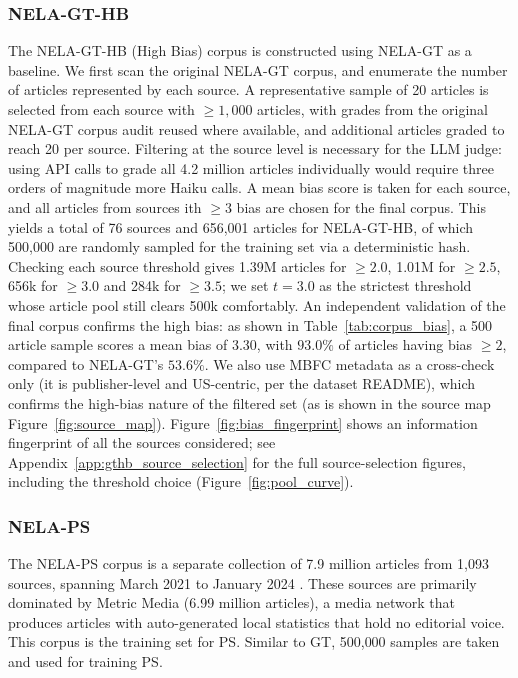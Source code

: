 \documentclass[12pt]{article}
\begin{document}
\subsubsection{NELA-GT-HB}
\label{subsec:gthb}
The NELA-GT-HB (High Bias) corpus is constructed using NELA-GT as a baseline.
We first scan the original NELA-GT corpus, and enumerate the number of articles represented by each source.
A representative sample of 20 articles is selected from each source with $\ge1{,}000$ articles, with grades from the original NELA-GT corpus audit reused where available, and additional articles graded to reach 20 per source.
Filtering at the source level is necessary for the LLM judge: using API calls to grade all 4.2 million articles individually would require three orders of magnitude more Haiku calls.  
A mean bias score is taken for each source, and all articles from sources ith $\ge3$ bias are chosen for the final corpus.
This yields a total of 76 sources and 656{,}001 articles for NELA-GT-HB, of which 500{,}000 are randomly sampled for the training set via a deterministic hash.
Checking each source threshold gives 1.39M articles for $\geq2.0$, 1.01M for $\geq2.5$, 656k for $\geq3.0$ and 284k for $\geq3.5$; we set $t=3.0$ as the strictest threshold whose article pool still clears 500k comfortably.
An independent validation of the final corpus confirms the high bias: as shown in Table~\ref{tab:corpus_bias}, a 500 article sample scores a mean bias of 3.30, with $93.0\%$ of articles having bias $\ge2$, compared to NELA-GT's $53.6\%$.
We also use MBFC metadata as a cross-check only (it is publisher-level and US-centric, per the dataset README), which confirms the high-bias nature of the filtered set (as is shown in the source map Figure~\ref{fig:source_map}).
Figure~\ref{fig:bias_fingerprint} shows an information fingerprint of all the sources considered; see Appendix~\ref{app:gthb_source_selection} for the full source-selection figures, including the threshold choice (Figure~\ref{fig:pool_curve}).

\subsubsection{NELA-PS}
The NELA-PS corpus is a separate collection of 7.9 million articles from 1{,}093 sources, spanning
March 2021 to January 2024 \cite{horne2024nelaps}. These sources are primarily dominated by Metric Media (6.99 million articles), a media 
network that produces articles with auto-generated local statistics that hold no editorial voice. This corpus is the training set for PS. 
Similar to GT, 500{,}000 samples are taken and used for training PS. 
\end{document}
